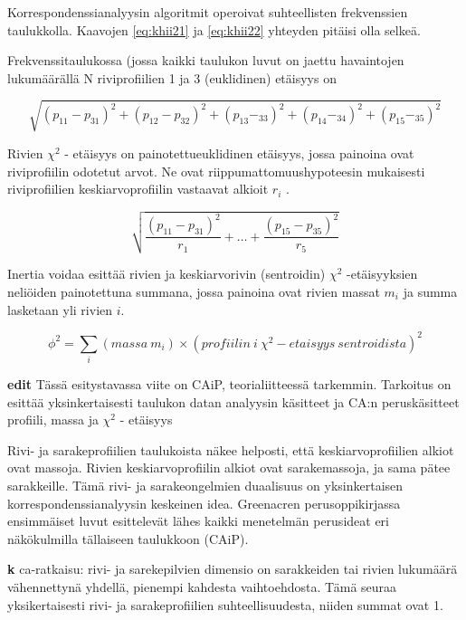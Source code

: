 \documentclass[
  finnish,
]{book}
\begin{document}
Korrespondenssianalyysin algoritmit operoivat suhteellisten frekvenssien
taulukkolla. Kaavojen \eqref{eq:khii21} ja \eqref{eq:khii22} yhteyden pitäisi olla
selkeä.

Frekvenssitaulukossa (jossa kaikki taulukon luvut on jaettu havaintojen
lukumäärällä N riviprofiilien 1 ja 3 (euklidinen) etäisyys on

\begin{equation}
 \sqrt{(p_{11} - p_{31})^2 + (p_{12} - p_{32})^2 + (p_{13} - _{33})^2+ (p_{14} - _{34})^2+ (p_{15} - _{35})^2}
 \label{eq:euclid1}
 \end{equation}

Rivien \(\chi^{2}\) - etäisyys on painotettueuklidinen etäisyys, jossa painoina
ovat riviprofiilin odotetut arvot. Ne ovat riippumattomuushypoteesin mukaisesti
riviprofiilien keskiarvoprofiilin vastaavat alkioit \(r_{i}\) .

\begin{equation}
 \sqrt{\frac{(p_{11} - p_{31})^2} { r_{1}} + \dots + \frac{(p_{15} - p_{35})^2} {r_{5}}}
 \label{eq:euclid2}
\end{equation}

Inertia voidaa esittää rivien ja keskiarvorivin (sentroidin) \(\chi^{2}\) -etäisyyksien
neliöiden painotettuna summana, jossa painoina ovat rivien massat \(m_{i}\) ja
summa lasketaan yli rivien \({i}\).

\begin{equation}
 \phi^{2} = \sum_{i} (massa \: m_{i}) \times (profiilin \: i \: \chi^{2} - etaisyys \: sentroidista)^{2}
 \label{eq:inert2}
\end{equation}

\textbf{edit} Tässä esitystavassa viite on CAiP, teorialiitteessä tarkemmin. Tarkoitus on esittää
yksinkertaisesti taulukon datan analyysin käsitteet ja CA:n peruskäsitteet profiili,
massa ja \(\chi^{2}\) - etäisyys

Rivi- ja sarakeprofiilien taulukoista näkee helposti, että keskiarvoprofiilien
alkiot ovat massoja. Rivien keskiarvoprofiilin alkiot ovat sarakemassoja, ja sama
pätee sarakkeille. Tämä rivi- ja sarakeongelmien duaalisuus on yksinkertaisen
korrespondenssianalyysin keskeinen idea. Greenacren perusoppikirjassa ensimmäiset
luvut esittelevät lähes kaikki menetelmän perusideat eri näkökulmilla
tällaiseen taulukkoon (CAiP).

\textbf{k} ca-ratkaisu: rivi- ja sarekepilvien dimensio on sarakkeiden tai rivien
lukumäärä vähennettynä yhdellä, pienempi kahdesta vaihtoehdosta. Tämä seuraa
yksikertaisesti rivi- ja sarakeprofiilien suhteellisuudesta, niiden summat ovat 1.
\end{document}
